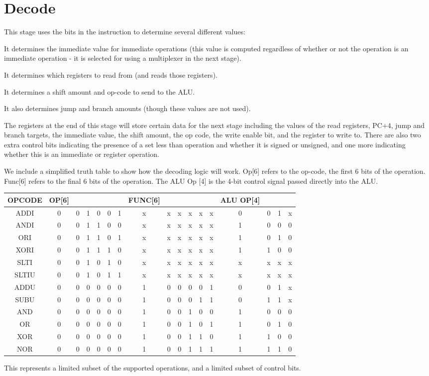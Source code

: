 \documentclass{article}
\begin{document}
\section*{Decode}
This stage uses the bits in the instruction to determine several different values:

It determines the immediate value for immediate operations (this value is computed regardless of whether or not the operation is an immediate operation - it is selected for using a multiplexer in the next stage).

It determines which registers to read from (and reads those registers).

It determines a shift amount and op-code to send to the ALU.

It also determines jump and branch amounts (though these values are not used).

The registers at the end of this stage will store certain data for the next stage including the values of the read registers, PC$+4$, jump and branch targets, the immediate value, the shift amount, the op code, the write enable bit, and the register to write to. There are also two extra control bits indicating the presence of a set less than operation and whether it is signed or unsigned, and one more indicating whether this is an immediate or register operation. 

We include a simplified truth table to show how the decoding logic will work. Op[6] refers to the op-code, the first 6 bits of the operation. Func[6] refers to the final 6 bits of the operation. The ALU Op [4] is the 4-bit control signal passed directly into the ALU. 

\begin{tabular}{c | c  c  c  c  c  c | c c c c c c | c c c c}
\hline
OPCODE & OP[6] &&&&&& FUNC[6] &&&&&& ALU OP[4] \\
\hline
ADDI	&0	&0	&1	&0	&0	&1	&x	&x	&x	&x	&x	&x	&0	&0	&1	&x \\
ANDI	&0	&0	&1	&1	&0	&0	&x	&x	&x	&x	&x	&x	&1	&0	&0	&0 \\
ORI		&0	&0	&1	&1	&0	&1	&x	&x	&x	&x	&x	&x	&1	&0	&1	&0 \\
XORI	&0	&0	&1	&1	&1	&0	&x	&x	&x	&x	&x	&x	&1	&1	&0	&0 \\
SLTI		&0	&0	&1	&0	&1	&0	&x	&x	&x	&x	&x	&x	&x	&x	&x	&x \\
SLTIU	&0	&0	&1	&0	&1	&1	&x	&x	&x	&x	&x	&x	&x	&x	&x	&x\\
\hline
ADDU	&0	&0	&0	&0	&0	&0	&1	&0	&0	&0	&0	&1	&0	&0	&1	&x\\
SUBU	&0	&0	&0	&0	&0	&0	&1	&0	&0	&0	&1	&1	&0	&1	&1	&x\\
AND		&0	&0	&0	&0	&0	&0	&1	&0	&0	&1	&0	&0	&1	&0	&0	&0\\
OR		&0	&0	&0	&0	&0	&0	&1	&0	&0	&1	&0	&1	&1	&0	&1	&0\\
XOR		&0	&0	&0	&0	&0	&0	&1	&0	&0	&1	&1	&0	&1	&1	&0	&0\\
NOR		&0	&0	&0	&0	&0	&0	&1	&0	&0	&1	&1	&1	&1	&1	&1	&0\\
\hline
\end{tabular}
This represents a limited subset of the supported operations, and a limited subset of control bits. 
\end{document}
